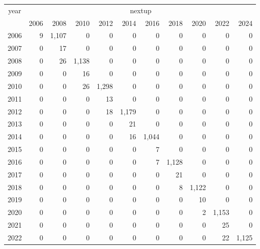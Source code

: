 \footnotesize\begin{tabular}[t]{lrrrrrrrrrr}
\toprule
\multicolumn{1}{c}{year} & \multicolumn{10}{c}{nextup} \\
\cmidrule(l{3pt}r{3pt}){1-1} \cmidrule(l{3pt}r{3pt}){2-11}
  & 2006 & 2008 & 2010 & 2012 & 2014 & 2016 & 2018 & 2020 & 2022 & 2024\\
\midrule
2006 & 9 & 1,107 & 0 & 0 & 0 & 0 & 0 & 0 & 0 & 0\\
2007 & 0 & 17 & 0 & 0 & 0 & 0 & 0 & 0 & 0 & 0\\
2008 & 0 & 26 & 1,138 & 0 & 0 & 0 & 0 & 0 & 0 & 0\\
2009 & 0 & 0 & 16 & 0 & 0 & 0 & 0 & 0 & 0 & 0\\
2010 & 0 & 0 & 26 & 1,298 & 0 & 0 & 0 & 0 & 0 & 0\\
2011 & 0 & 0 & 0 & 13 & 0 & 0 & 0 & 0 & 0 & 0\\
2012 & 0 & 0 & 0 & 18 & 1,179 & 0 & 0 & 0 & 0 & 0\\
2013 & 0 & 0 & 0 & 0 & 21 & 0 & 0 & 0 & 0 & 0\\
2014 & 0 & 0 & 0 & 0 & 16 & 1,044 & 0 & 0 & 0 & 0\\
2015 & 0 & 0 & 0 & 0 & 0 & 7 & 0 & 0 & 0 & 0\\
2016 & 0 & 0 & 0 & 0 & 0 & 7 & 1,128 & 0 & 0 & 0\\
2017 & 0 & 0 & 0 & 0 & 0 & 0 & 21 & 0 & 0 & 0\\
2018 & 0 & 0 & 0 & 0 & 0 & 0 & 8 & 1,122 & 0 & 0\\
2019 & 0 & 0 & 0 & 0 & 0 & 0 & 0 & 10 & 0 & 0\\
2020 & 0 & 0 & 0 & 0 & 0 & 0 & 0 & 2 & 1,153 & 0\\
2021 & 0 & 0 & 0 & 0 & 0 & 0 & 0 & 0 & 25 & 0\\
2022 & 0 & 0 & 0 & 0 & 0 & 0 & 0 & 0 & 22 & 1,125\\
\bottomrule
\end{tabular}
